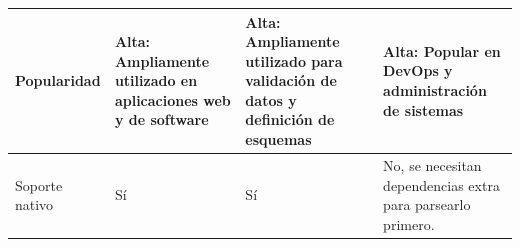 \begin{longtable}{|p{3cm}|p{4.5cm}|p{5cm}|p{4.5cm}|}
    \hline
    Popularidad             & Alta: Ampliamente utilizado en aplicaciones web y de software        & Alta: Ampliamente utilizado para validación de datos y definición de esquemas                                              & Alta: Popular en DevOps y administración de sistemas                                                        \\
    \hline
    Soporte nativo          & Sí                                                                   & Sí                                                                                                                         & No, se necesitan dependencias extra para parsearlo primero.                                                 \\
    \hline
\end{longtable}
\restoregeometry
